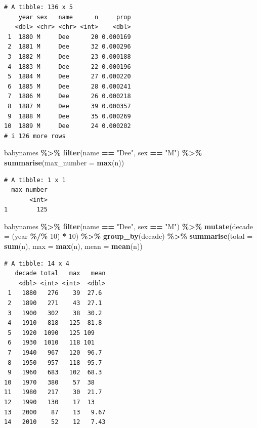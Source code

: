 \documentclass[
]{book}
\newenvironment{Shaded}{\begin{snugshade}}{\end{snugshade}}
\newcommand{\AttributeTok}[1]{\textcolor[rgb]{0.13,0.29,0.53}{#1}}
\newcommand{\DecValTok}[1]{\textcolor[rgb]{0.00,0.00,0.81}{#1}}
\newcommand{\FunctionTok}[1]{\textcolor[rgb]{0.13,0.29,0.53}{\textbf{#1}}}
\newcommand{\NormalTok}[1]{#1}
\newcommand{\SpecialCharTok}[1]{\textcolor[rgb]{0.81,0.36,0.00}{\textbf{#1}}}
\newcommand{\StringTok}[1]{\textcolor[rgb]{0.31,0.60,0.02}{#1}}
\begin{document}
\begin{verbatim}
# A tibble: 136 x 5
    year sex   name      n     prop
   <dbl> <chr> <chr> <int>    <dbl>
 1  1880 M     Dee      20 0.000169
 2  1881 M     Dee      32 0.000296
 3  1882 M     Dee      23 0.000188
 4  1883 M     Dee      22 0.000196
 5  1884 M     Dee      27 0.000220
 6  1885 M     Dee      28 0.000241
 7  1886 M     Dee      26 0.000218
 8  1887 M     Dee      39 0.000357
 9  1888 M     Dee      35 0.000269
10  1889 M     Dee      24 0.000202
# i 126 more rows
\end{verbatim}

\begin{Shaded}
\begin{Highlighting}[]
\NormalTok{babynames }\SpecialCharTok{\%\textgreater{}\%} 
  \FunctionTok{filter}\NormalTok{(name }\SpecialCharTok{==} \StringTok{"Dee"}\NormalTok{, sex }\SpecialCharTok{==} \StringTok{"M"}\NormalTok{) }\SpecialCharTok{\%\textgreater{}\%} 
  \FunctionTok{summarise}\NormalTok{(}\AttributeTok{max\_number =} \FunctionTok{max}\NormalTok{(n))}
\end{Highlighting}
\end{Shaded}

\begin{verbatim}
# A tibble: 1 x 1
  max_number
       <int>
1        125
\end{verbatim}

\begin{Shaded}
\begin{Highlighting}[]
\NormalTok{babynames }\SpecialCharTok{\%\textgreater{}\%} 
  \FunctionTok{filter}\NormalTok{(name }\SpecialCharTok{==} \StringTok{"Dee"}\NormalTok{, sex }\SpecialCharTok{==} \StringTok{"M"}\NormalTok{) }\SpecialCharTok{\%\textgreater{}\%} 
  \FunctionTok{mutate}\NormalTok{(}\AttributeTok{decade =}\NormalTok{ (year }\SpecialCharTok{\%/\%} \DecValTok{10}\NormalTok{) }\SpecialCharTok{*} \DecValTok{10}\NormalTok{) }\SpecialCharTok{\%\textgreater{}\%} 
  \FunctionTok{group\_by}\NormalTok{(decade) }\SpecialCharTok{\%\textgreater{}\%}
  \FunctionTok{summarise}\NormalTok{(}\AttributeTok{total =} \FunctionTok{sum}\NormalTok{(n),}
            \AttributeTok{max =} \FunctionTok{max}\NormalTok{(n), }
            \AttributeTok{mean =} \FunctionTok{mean}\NormalTok{(n))}
\end{Highlighting}
\end{Shaded}

\begin{verbatim}
# A tibble: 14 x 4
   decade total   max   mean
    <dbl> <int> <int>  <dbl>
 1   1880   276    39  27.6 
 2   1890   271    43  27.1 
 3   1900   302    38  30.2 
 4   1910   818   125  81.8 
 5   1920  1090   125 109   
 6   1930  1010   118 101   
 7   1940   967   120  96.7 
 8   1950   957   118  95.7 
 9   1960   683   102  68.3 
10   1970   380    57  38   
11   1980   217    30  21.7 
12   1990   130    17  13   
13   2000    87    13   9.67
14   2010    52    12   7.43
\end{verbatim}
\end{document}
